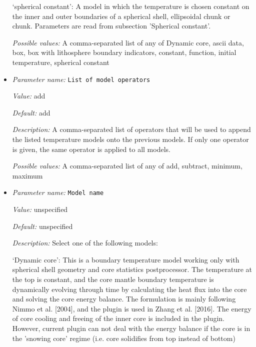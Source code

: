 \begin{itemize}
`spherical constant': A model in which the temperature is chosen constant on the inner and outer boundaries of a spherical shell, ellipsoidal chunk or chunk. Parameters are read from subsection 'Spherical constant'.


{\it Possible values:} A comma-separated list of any of Dynamic core, ascii data, box, box with lithosphere boundary indicators, constant, function, initial temperature, spherical constant
\item {\it Parameter name:} {\tt List of model operators}
\label{parameters:Boundary temperature model/List of model operators}


{\it Value:} add


{\it Default:} add


{\it Description:} A comma-separated list of operators that will be used to append the listed temperature models onto the previous models. If only one operator is given, the same operator is applied to all models.


{\it Possible values:} A comma-separated list of any of add, subtract, minimum, maximum
\item {\it Parameter name:} {\tt Model name}
\label{parameters:Boundary temperature model/Model name}


{\it Value:} unspecified


{\it Default:} unspecified


{\it Description:} Select one of the following models:

`Dynamic core': This is a boundary temperature model working only with spherical shell geometry and core statistics postprocessor. The temperature at the top is constant, and the core mantle boundary temperature is dynamically evolving through time by calculating the heat flux into the core and solving the core energy balance. The formulation is mainly following Nimmo et al. [2004], and the plugin is used in Zhang et al. [2016]. The energy of core cooling and freeing of the inner core is included in the plugin. However, current plugin can not deal with the energy balance if the core is in the 'snowing core' regime (i.e. core solidifies from top instead of bottom)


\end{itemize}
